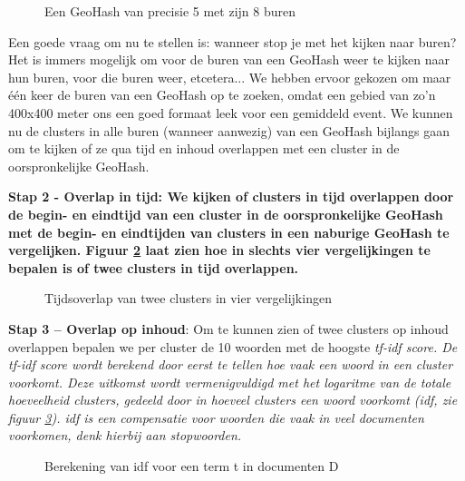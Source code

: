 {{\begin{bullets}
\begin{figure}[H]
  \centering
    \caption{Een GeoHash van precisie 5 met zijn 8 buren}
  \label{geoneigh}
\end{figure}

Een goede vraag om nu te stellen is: wanneer stop je met het kijken naar buren? 
Het is immers mogelijk om voor de buren van een GeoHash weer te kijken naar hun 
buren, voor die buren weer, etcetera... We hebben ervoor gekozen om maar \'e\'en 
keer de buren van een GeoHash op te zoeken, omdat een gebied van zo'n 400x400 
meter ons een goed formaat leek voor een gemiddeld event. 
\vl
We kunnen nu de clusters in alle buren (wanneer aanwezig) van een GeoHash 
bijlangs gaan om te kijken of ze qua tijd en inhoud overlappen met een cluster 
in de oorspronkelijke GeoHash.

\item \bf{Stap 2 - Overlap in tijd}: We kijken of clusters in tijd overlappen door de 
begin- en eindtijd van een cluster in de oorspronkelijke GeoHash met de begin- 
en eindtijden van clusters in een naburige GeoHash te vergelijken. Figuur \ref{overlap} laat 
zien hoe in slechts vier vergelijkingen te bepalen is of twee clusters in tijd 
overlappen.

\begin{figure}[H]
  \centering
    \caption{Tijdsoverlap van twee clusters in vier vergelijkingen}
  \label{overlap}
\end{figure}

\item \textbf{Stap 3 – Overlap op inhoud}: Om te kunnen zien of twee clusters op inhoud 
overlappen bepalen we per cluster de 10 woorden met de hoogste \it{tf-idf score}. De 
tf-idf score wordt berekend door eerst te tellen hoe vaak een woord in een 
cluster voorkomt. Deze uitkomst wordt vermenigvuldigd met het logaritme van de 
totale hoeveelheid clusters, gedeeld door in hoeveel clusters een woord
voorkomt (\it{idf}, zie figuur \ref{idf}). idf is een compensatie voor woorden die vaak in 
veel documenten voorkomen, denk hierbij aan stopwoorden.

\begin{figure}[H]
  \centering
    \caption{Berekening van idf voor een term t in documenten D}
  \label{idf}
\end{figure}

\end{bullets}

}}
